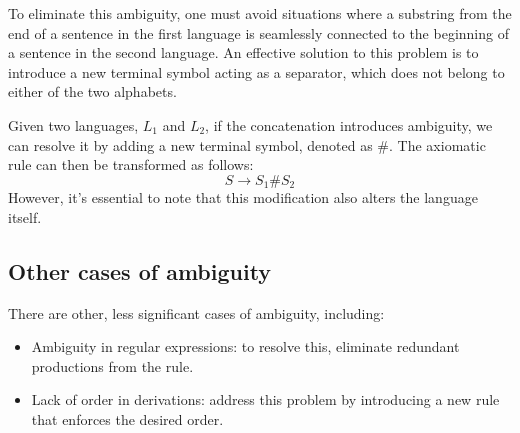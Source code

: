 To eliminate this ambiguity, one must avoid situations where a substring from the end of a sentence in the first language is seamlessly connected to the beginning of a sentence in the second language.
An effective solution to this problem is to introduce a new terminal symbol acting as a separator, which does not belong to either of the two alphabets.
\begin{example}
    Given two languages, $L_1$ and $L_2$, if the concatenation introduces ambiguity, we can resolve it by adding a new terminal symbol, denoted as $\#$.
    The axiomatic rule can then be transformed as follows:
    \[S \rightarrow S_1 \# S_2\]
    However, it's essential to note that this modification also alters the language itself.
\end{example}

\subsection*{Other cases of ambiguity}
There are other, less significant cases of ambiguity, including:
\begin{itemize}
    \item Ambiguity in regular expressions: to resolve this, eliminate redundant productions from the rule.
    \item Lack of order in derivations: address this problem by introducing a new rule that enforces the desired order.
\end{itemize}